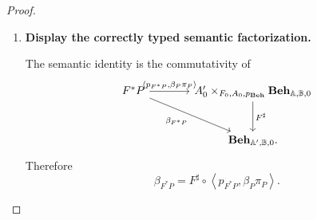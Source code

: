 \begin{proof}
\begin{enumerate}
        Thus the residual behaviour of \((v',x)\) is the residual behaviour
        of \(x\) precomposed with
        \[
            F_{/v'}:
            \mathbb A'/v'\to\mathbb A/F_0(v').
        \]
        Hence
        \[
            \beta_{F^*P}(v',x)
            =
            F^\sharp(v',\beta_P(x)).
        \]

        \item \textbf{Display the correctly typed semantic factorization.}

        The semantic identity is the commutativity of
        \[
        \begin{tikzcd}[column sep=large, row sep=large]
            F^*P
                \arrow[r,
                    "{\langle
                        p_{F^*P},
                        \beta_P\pi_P
                    \rangle}"]
                \arrow[dr, "\beta_{F^*P}"']
            &
            A'_0
            \times_{F_0,A_0,p_{\mathbf{Beh}}}
            \mathbf{Beh}_{\mathbb A,\mathbb B,0}
                \arrow[d, "F^\sharp"]
            \\
            &
            \mathbf{Beh}_{\mathbb A',\mathbb B,0}.
        \end{tikzcd}
        \]
        Therefore
        \[
            \beta_{F^*P}
            =
            F^\sharp
            \circ
            \left\langle
                p_{F^*P},
                \beta_P\pi_P
            \right\rangle.
        \]
    \end{enumerate}
\end{proof}

